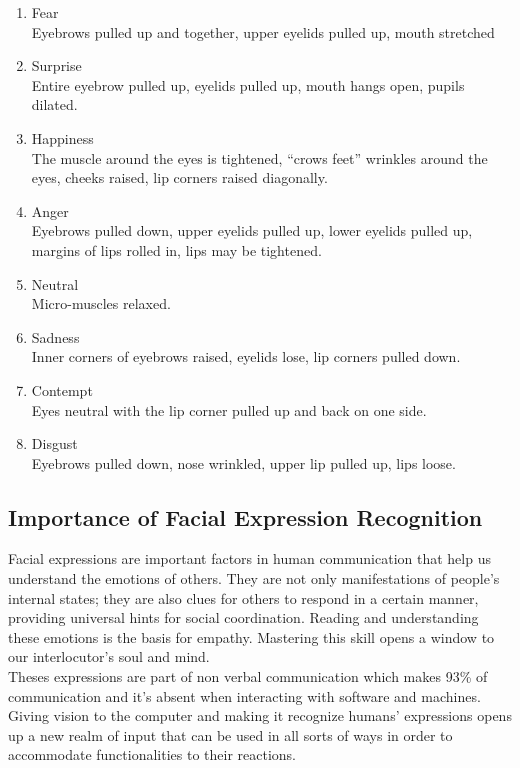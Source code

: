 \documentclass[12pt,a4paper,oneside,english]{book}
\begin{document}
\begin{enumerate}
    \item Fear
    \\
    \hspace*{0.3cm}
    Eyebrows pulled up and together, upper eyelids pulled up, mouth stretched
    \item Surprise
    \\
    \hspace*{0.3cm}
    Entire eyebrow pulled up, eyelids pulled up, mouth hangs open, pupils dilated.
    \item Happiness
    \\
    \hspace*{0.3cm}
    The muscle around the eyes is tightened, “crows feet” wrinkles around the eyes, cheeks raised, lip corners raised diagonally.
    \item Anger
    \\
    \hspace*{0.3cm}
    Eyebrows pulled down, upper eyelids pulled up, lower eyelids pulled up, margins of lips rolled in, lips may be tightened.
    \item Neutral
    \\
    \hspace*{0.3cm}
    Micro-muscles relaxed.
    \item Sadness
    \\
    \hspace*{0.3cm}
    Inner corners of eyebrows raised, eyelids lose, lip corners pulled down.
    \item Contempt
    \\
    \hspace*{0.3cm}
    Eyes neutral with the lip corner pulled up and back on one side.
    \item Disgust
    \\
    \hspace*{0.3cm}
    Eyebrows pulled down, nose wrinkled, upper lip pulled up, lips loose.
\end{enumerate}

\subsection{Importance of Facial Expression Recognition}
Facial expressions are important factors in human communication that help us understand the emotions of others. They are not only manifestations of people's internal states; they are also clues for others to respond in a certain manner, providing universal hints for social coordination. Reading and understanding these emotions is the basis for empathy. Mastering this skill opens a window to our interlocutor's soul and mind.\\
Theses expressions are part of non verbal communication which makes 93\% of communication and it's absent when interacting with software and machines. Giving vision to the computer and making it recognize humans' expressions opens up a new realm of input that can be used in all sorts of ways in order to accommodate functionalities to their reactions. 
\end{document}
